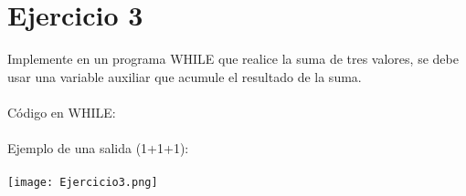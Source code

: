 \documentclass[16]{article} %
\begin{document}
\section*{Ejercicio 3}
\noindent
Implemente en un programa WHILE que realice la suma de tres valores, se debe usar una variable auxiliar que acumule el resultado de la suma.\\\\
Código en WHILE:
\\\\
Ejemplo de una salida (1+1+1):\\\\
\texttt{[image: Ejercicio3.png]}
\end{document}
